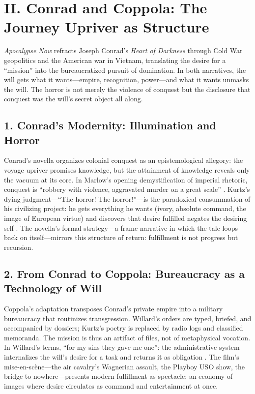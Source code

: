 \section*{II. Conrad and Coppola: The Journey Upriver as Structure}
\label{sec:ii-conrad-and-coppola}

\textit{Apocalypse Now} refracts Joseph Conrad's \textit{Heart of Darkness} through Cold War
geopolitics and the American war in Vietnam, translating the desire for a ``mission'' into the
bureaucratized pursuit of domination. In both narratives, the will gets what it
wants---empire, recognition, power---and what it wants unmasks the will. The horror is not
merely the violence of conquest but the disclosure that conquest was the will's secret object
all along.

\subsection*{1. Conrad’s Modernity: Illumination and Horror}
\label{ssec:1-conrad-s-modernity-illumination-and-horror}
Conrad’s novella organizes colonial conquest as an epistemological allegory: the voyage upriver promises knowledge, but the attainment of knowledge reveals only the vacuum at its core. In Marlow’s opening demystification of imperial rhetoric, conquest is ``robbery with violence, aggravated murder on a great scale'' \parencite[ConradHOD1990]{ConradHOD1990}. Kurtz’s dying judgment---``The horror! The horror!''---is the paradoxical consummation of his civilizing project: he gets everything he wants (ivory, absolute command, the image of European virtue) and discovers that desire fulfilled negates the desiring self \parencite{ConradHOD1990}. The novella’s formal strategy---a frame narrative in which the tale loops back on itself---mirrors this structure of return: fulfillment is not progress but recursion.

\subsection*{2. From Conrad to Coppola: Bureaucracy as a Technology of Will}
\label{ssec:2-from-conrad-to-coppola-bureaucracy-as-a-technology-of-will}
Coppola’s adaptation transposes Conrad’s private empire into a military bureaucracy that routinizes transgression. Willard’s orders are typed, briefed, and accompanied by dossiers; Kurtz’s poetry is replaced by radio logs and classified memoranda. The mission is thus an artifact of files, not of metaphysical vocation. In Willard’s terms, ``for my sins they gave me one'': the administrative system internalizes the will’s desire for a task and returns it as obligation \parencite{CoppolaApocalypse1979}. The film’s mise-en-scène—the air cavalry’s Wagnerian assault, the Playboy USO show, the bridge to nowhere—presents modern fulfillment as spectacle: an economy of images where desire circulates as command and entertainment at once.

